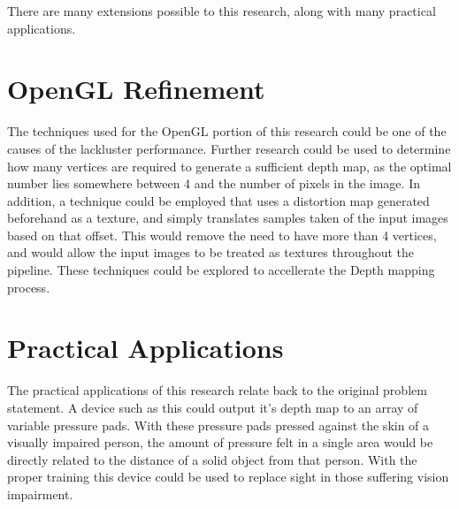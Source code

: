 There are many extensions possible to this research, along with many practical applications.
\section{OpenGL Refinement}
The techniques used for the OpenGL portion of this research could be one of the causes of the lackluster performance.  Further research could be used to determine how many vertices are required to generate a sufficient depth map, as the optimal number lies somewhere between 4 and the number of pixels in the image.  In addition, a technique could be employed that uses a distortion map generated beforehand as a texture, and simply translates samples taken of the input images based on that offset.  This would remove the need to have more than 4 vertices, and would allow the input images to be treated as textures throughout the pipeline.  These techniques could be explored to accellerate the Depth mapping process.

\section{Practical Applications}
The practical applications of this research relate back to the original problem statement.  A device such as this could output it's depth map to an array of variable pressure pads.  With these pressure pads pressed against the skin of a visually impaired person, the amount of pressure felt in a single area would be directly related to the distance of a solid object from that person.  With the proper training this device could be used to replace sight in those suffering vision impairment.